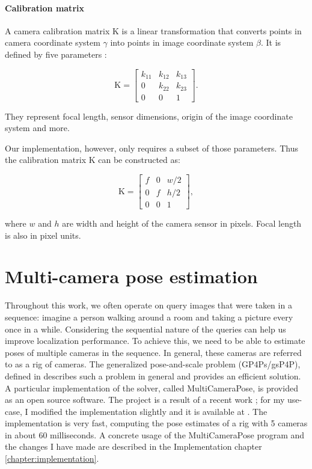 \documentclass[twoside]{ctuthesis}
\theoremstyle{plain}
\theoremstyle{definition}
\theoremstyle{note}
\begin{document}
\paragraph{Calibration matrix}
A camera calibration matrix K is a linear transformation that converts points in camera coordinate system $\gamma$ into points in image coordinate system $\beta$. It is defined by five parameters \cite{GVG}:

\begin{equation}
	\text{K} = \begin{bmatrix}
		k_{11} & k_{12} & k_{13} \\
		0 & k_{22} & k_{23} \\
		0 & 0 & 1
		\end{bmatrix}.
\end{equation}

They represent focal length, sensor dimensions, origin of the image coordinate system and more.

Our implementation, however, only requires a subset of those parameters. Thus the calibration matrix K can be constructed as:

\begin{equation}
	\text{K} = \begin{bmatrix}
		f & 0 & w/2 \\
		0 & f & h/2 \\
		0 & 0 & 1
		\end{bmatrix},
\end{equation}

where $w$ and $h$ are width and height of the camera sensor in pixels. Focal length is also in pixel units.

\section{Multi-camera pose estimation}

Throughout this work, we often operate on query images that were taken in a sequence: imagine a person walking around a room and taking a picture every once in a while. Considering the sequential nature of the queries can help us improve localization performance. To achieve this, we need to be able to estimate poses of multiple cameras in the sequence. In general, these cameras are referred to as a rig of cameras. The generalized pose-and-scale problem (GP4Ps/gsP4P), defined in \cite{Kukelova2016CVPR} describes such a problem in general and provides an efficient solution. A particular implementation of the solver, called MultiCameraPose, is provided as an open source software. The project is a result of a recent work \cite{MultiCameraPosePaper}; for my use-case, I modified the implementation slightly and it is available at \cite{MultiCameraPose}. The implementation is very fast, computing the pose estimates of a rig with 5 cameras in about 60 milliseconds. A concrete usage of the MultiCameraPose program and the changes I have made are described in the Implementation chapter \ref{chapter:implementation}.
\end{document}

